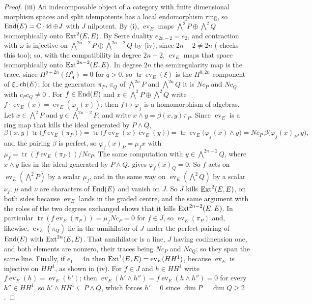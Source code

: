 \begin{proof}
(iii) An indecomposable object of a category with finite dimensional
morphism spaces and split idempotents has a local endomorphism ring, so
$\operatorname{End}(E)=\mathbb{C}\cdot\operatorname{id}\oplus J$ with $J$ nilpotent. By
(i), $\operatorname{ev}_{E}$ maps
$\bigwedge^{2}P\oplus\bigwedge^{2}Q$ isomorphically onto $\operatorname{Ext}^{2}(E,E)$.
By Serre duality $e_{2n-2}=e_{2}$, and contraction with $\omega$ is injective
on $\bigwedge^{2n-2}P\oplus\bigwedge^{2n-2}Q$ by (iv),
since $2n-2\ne2n$ (\cite{BMB26} checks this too); so, with the compatibility in
degree $2n-2$, $\operatorname{ev}_{E}$ maps that space isomorphically onto
$\operatorname{Ext}^{2n-2}(E,E)$. In degree $2n$ the semiregularity map is the trace, since
$H^{q+2n}(\Omega^{q}_{A})=0$ for $q>0$, so
$\operatorname{tr}\operatorname{ev}_{E}(\xi)$ is the $H^{0,2n}$ component of
$\xi\lrcorner\operatorname{ch}(E)$; for the generators $\pi_{P}$, $\pi_{Q}$ of
$\bigwedge^{2n}P$ and $\bigwedge^{2n}Q$ it is $Nc_{P}$ and $Nc_{Q}$ with
$c_{P}c_{Q}\ne0$ \cite{BMB26}. For $f\in\operatorname{End}(E)$ and
$x\in\bigwedge^{2}P\oplus\bigwedge^{2}Q$ write
$f\cdot\operatorname{ev}_{E}(x)=\operatorname{ev}_{E}(\varphi_{f}(x))$; then
$f\mapsto\varphi_{f}$ is a homomorphism of algebras. Let $x\in\bigwedge^{2}P$
and $y\in\bigwedge^{2n-2}P$, and write $x\wedge y=\beta(x,y)\pi_{P}$. Since
$\operatorname{ev}_{E}$ is a ring map that kills the ideal generated by
$P\wedge Q$,
\[
  \beta(x,y)\operatorname{tr}\bigl(f\operatorname{ev}_{E}(\pi_{P})\bigr)
  =\operatorname{tr}\bigl(f\operatorname{ev}_{E}(x)\operatorname{ev}_{E}(y)\bigr)
  =\operatorname{tr}\operatorname{ev}_{E}\bigl(\varphi_{f}(x)\wedge y\bigr)
  =Nc_{P}\,\beta\bigl(\varphi_{f}(x)_{P},y\bigr),
\]
and the pairing $\beta$ is perfect, so $\varphi_{f}(x)_{P}=\mu_{f}x$ with
$\mu_{f}=\operatorname{tr}(f\operatorname{ev}_{E}(\pi_{P}))/Nc_{P}$. The same
computation with $y\in\bigwedge^{2n-2}Q$, where $x\wedge y$ lies in the ideal
generated by $P\wedge Q$, gives $\varphi_{f}(x)_{Q}=0$. So $f$ acts on
$\operatorname{ev}_{E}(\bigwedge^{2}P)$ by a scalar $\mu_{f}$, and in the same
way on $\operatorname{ev}_{E}(\bigwedge^{2}Q)$ by a scalar $\nu_{f}$; $\mu$ and
$\nu$ are characters of $\operatorname{End}(E)$ and vanish on $J$. So $J$ kills
$\operatorname{Ext}^{2}(E,E)$, on both sides because $\operatorname{ev}_{E}$ lands in the
graded centre, and the same argument with the roles of the two degrees
exchanged shows that it kills $\operatorname{Ext}^{2n-2}(E,E)$. In particular
$\operatorname{tr}(f\operatorname{ev}_{E}(\pi_{P}))=\mu_{f}Nc_{P}=0$ for
$f\in J$, so $\operatorname{ev}_{E}(\pi_{P})$ and, likewise,
$\operatorname{ev}_{E}(\pi_{Q})$ lie in the annihilator of $J$ under the
perfect pairing of $\operatorname{End}(E)$ with $\operatorname{Ext}^{2n}(E,E)$. That annihilator is a
line, $J$ having codimension one, and both elements are nonzero, their traces
being $Nc_{P}$ and $Nc_{Q}$; so they span the same line. Finally, if
$e_{1}=4n$ then $\operatorname{Ext}^{1}(E,E)=\operatorname{ev}_{E}(HH^{1})$, because
$\operatorname{ev}_{E}$ is injective on $HH^{1}$, as shown in (iv). For
$f\in J$ and $h\in HH^{1}$ write $f\operatorname{ev}_{E}(h)=
\operatorname{ev}_{E}(h')$; then
$\operatorname{ev}_{E}(h'\wedge h'')=f\operatorname{ev}_{E}(h\wedge h'')=0$ for
every $h''\in HH^{1}$, so $h'\wedge HH^{1}\subseteq P\wedge Q$, which forces
$h'=0$ since $\dim P=\dim Q\ge2$.


\end{proof}
